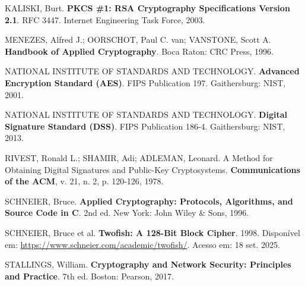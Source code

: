 \documentclass[12pt,a4paper,oneside]{article}
\begin{document}
KALISKI, Burt. \textbf{PKCS \#1: RSA Cryptography Specifications Version 2.1}. RFC 3447. Internet Engineering Task Force, 2003.

MENEZES, Alfred J.; OORSCHOT, Paul C. van; VANSTONE, Scott A. \textbf{Handbook of Applied Cryptography}. Boca Raton: CRC Press, 1996.

NATIONAL INSTITUTE OF STANDARDS AND TECHNOLOGY. \textbf{Advanced Encryption Standard (AES)}. FIPS Publication 197. Gaithersburg: NIST, 2001.

NATIONAL INSTITUTE OF STANDARDS AND TECHNOLOGY. \textbf{Digital Signature Standard (DSS)}. FIPS Publication 186-4. Gaithersburg: NIST, 2013.

RIVEST, Ronald L.; SHAMIR, Adi; ADLEMAN, Leonard. A Method for Obtaining Digital Signatures and Public-Key Cryptosystems. \textbf{Communications of the ACM}, v. 21, n. 2, p. 120-126, 1978.

SCHNEIER, Bruce. \textbf{Applied Cryptography: Protocols, Algorithms, and Source Code in C}. 2nd ed. New York: John Wiley \& Sons, 1996.

SCHNEIER, Bruce et al. \textbf{Twofish: A 128-Bit Block Cipher}. 1998. Disponível em: \url{https://www.schneier.com/academic/twofish/}. Acesso em: 18 set. 2025.

STALLINGS, William. \textbf{Cryptography and Network Security: Principles and Practice}. 7th ed. Boston: Pearson, 2017.
\end{document}
